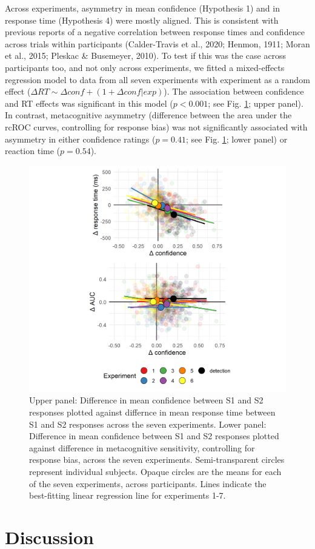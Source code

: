 \documentclass[12pt,twoside]{reedthesis}
\begin{document}
Across experiments, asymmetry in mean confidence (Hypothesis 1) and in response time (Hypothesis 4) were mostly aligned. This is consistent with previous reports of a negative correlation between response times and confidence across trials within participants (Calder-Travis et al., 2020; Henmon, 1911; Moran et al., 2015; Pleskac \& Busemeyer, 2010). To test if this was the case across participants too, and not only across experiments, we fitted a mixed-effects regression model to data from all seven experiments with experiment as a random effect (\(\Delta RT \sim \Delta conf+(1+\Delta conf|exp)\)). The association between confidence and RT effects was significant in this model (\(p<0.001\); see Fig. \ref{fig:asymmetry-correlations-fig}; upper panel). In contrast, metacognitive asymmetry (difference between the area under the rcROC curves, controlling for response bias) was not significantly associated with asymmetry in either confidence ratings (\(p=0.41\); see Fig. \ref{fig:asymmetry-correlations-fig}; lower panel) or reaction time (\(p=0.54\)).
\begin{figure}
\includegraphics[width=1\linewidth]{figure/asymmetry/correlations} \caption[Inter-subject correlations between reaction time, confidence, and metacognitive asymmetries]{Upper panel: Difference in mean confidence between S1 and S2 responses plotted against differnce in mean response time between S1 and S2 responses across the seven experiments. Lower panel: Difference in mean confidence between S1 and S2 responses plotted against difference in metacognitive sensitivity, controlling for response bias, across the seven experiments. Semi-transparent circles represent individual subjects. Opaque circles are the means for each of the seven experiments, across participants. Lines indicate the best-fitting linear regression line for experiments 1-7.}\label{fig:asymmetry-correlations-fig}
\end{figure}
\hypertarget{discussion-4}{%
\section{Discussion}\label{discussion-4}}
\end{document}
